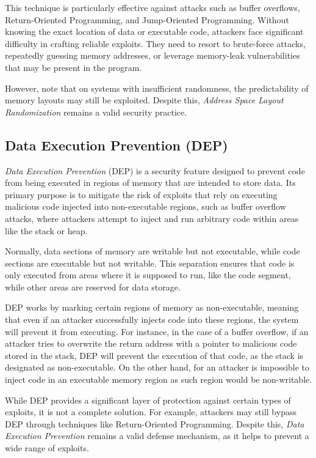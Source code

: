 This technique is particularly effective against attacks such as buffer overflows,
Return-Oriented Programming, and Jump-Oriented Programming. Without knowing the
exact location of data or executable code, attackers face significant difficulty
in crafting reliable exploits. They need to resort to brute-force attacks, repeatedly
guessing memory addresses, or leverage memory-leak vulnerabilities that may be
present in the program.

However, note that on systems with insufficient randomness, the predictability
of memory layouts may still be exploited. Despite this, \textit{Address Space
Layout Randomization} remains a valid security practice.

\subsection{Data Execution Prevention (DEP)}
\label{subsec:background_dep}

\textit{Data Execution Prevention} (DEP) is a security feature designed to prevent
code from being executed in regions of memory that are intended to store data.
Its primary purpose is to mitigate the risk of exploits that rely on executing
malicious code injected into non-executable regions, such as buffer overflow attacks,
where attackers attempt to inject and run arbitrary code within areas like the
stack or heap.

Normally, data sections of memory are writable but not executable, while code
sections are executable but not writable. This separation ensures that code is only
executed from areas where it is supposed to run, like the code segment, while other
areas are reserved for data storage.

DEP works by marking certain regions of memory as non-executable, meaning that
even if an attacker successfully injects code into these regions, the system will
prevent it from executing. For instance, in the case of a buffer overflow, if an
attacker tries to overwrite the return address with a pointer to malicious code
stored in the stack, DEP will prevent the execution of that code, as the stack
is designated as non-executable. On the other hand, for an attacker is
impossible to inject code in an executable memory region as such region would be
non-writable.

While DEP provides a significant layer of protection against certain types of
exploits, it is not a complete solution. For example, attackers may still bypass
DEP through techniques like Return-Oriented Programming. Despite this, \textit{Data
Execution Prevention} remains a valid defense mechanism, as it helps to prevent a
wide range of exploits.

